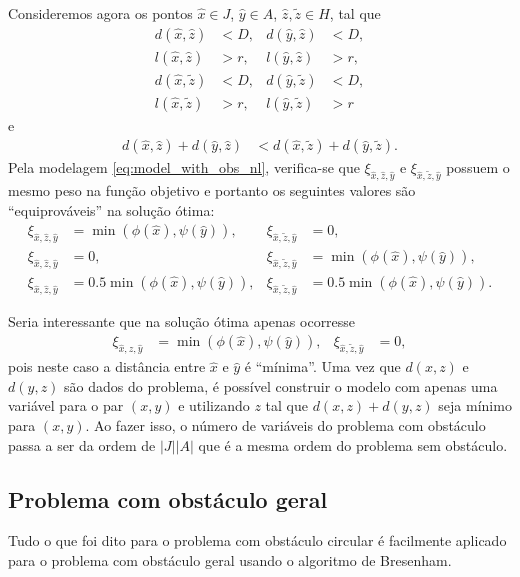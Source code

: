 Consideremos agora os pontos $\hat{x} \in J$, $\hat{y} \in A$, $\hat{z},
\tilde{z} \in H$, tal que
\begin{align*}
    d(\hat{x}, \hat{z}) &< D, & d(\hat{y}, \hat{z}) &< D, \\
    l(\hat{x}, \hat{z}) &> r, & l(\hat{y}, \hat{z}) &> r, \\
    d(\hat{x}, \tilde{z}) &< D, & d(\hat{y}, \tilde{z}) &< D, \\
    l(\hat{x}, \tilde{z}) &> r, & l(\hat{y}, \tilde{z}) &> r
\end{align*}
e
\begin{align*}
    d(\hat{x}, \hat{z}) + d(\hat{y}, \hat{z}) &< d(\hat{x}, \tilde{z}) +
    d(\hat{y}, \tilde{z}).
\end{align*}
Pela modelagem \eqref{eq:model_with_obs_nl}, verifica-se que
$\xi_{\hat{x},\hat{z},\hat{y}}$ e $\xi_{\hat{x},\tilde{z},\hat{y}}$
possuem o mesmo peso na fun\c{c}\~{a}o objetivo e portanto os seguintes valores
s\~{a}o ``equiprov\'{a}veis'' na solu\c{c}\~{a}o \'{o}tima:
\begin{align*}
    \xi_{\hat{x},\hat{z},\hat{y}} &= \min(\phi(\hat{x}), \psi(\hat{y})), &
    \xi_{\hat{x},\tilde{z},\hat{y}} &= 0, \\
    \xi_{\hat{x},\hat{z},\hat{y}} &= 0, &
    \xi_{\hat{x},\tilde{z},\hat{y}} &= \min(\phi(\hat{x}), \psi(\hat{y})), \\
    \xi_{\hat{x},\hat{z},\hat{y}} &= 0.5 \min(\phi(\hat{x}), \psi(\hat{y})), &
    \xi_{\hat{x},\tilde{z},\hat{y}} &= 0.5 \min(\phi(\hat{x}), \psi(\hat{y})).
\end{align*}

Seria interessante que na solu\c{c}\~{a}o \'{o}tima apenas ocorresse
\begin{align*}
    \xi_{\hat{x},\hat{z},\hat{y}} &= \min(\phi(\hat{x}), \psi(\hat{y})), &
    \xi_{\hat{x},\tilde{z},\hat{y}} &= 0,
\end{align*}
pois neste caso a dist\^{a}ncia entre $\hat{x}$ e $\hat{y}$ \'{e}
``m\'{i}nima''. Uma vez que $d(x, z)$ e $d(y, z)$ s\~{a}o dados do problema, \'{e}
poss\'{i}vel construir o modelo com apenas uma vari\'{a}vel para o par
$(x, y)$ e utilizando $z$ tal que $d(x, z) + d(y, z)$ seja m\'{i}nimo para $(x,
y)$. Ao fazer isso, o n\'{u}mero de vari\'{a}veis do problema com obst\'{a}culo
passa a ser da ordem de $|J| |A|$ que \'{e} a mesma ordem do problema sem
obst\'{a}culo.

\subsection{Problema com obst\'{a}culo geral}
Tudo o que foi dito para o problema com obst\'{a}culo circular \'{e} facilmente
aplicado para o problema com obst\'{a}culo geral usando o algoritmo de
Bresenham.
